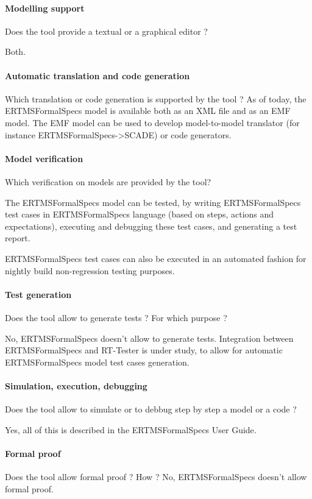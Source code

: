 \begin{author_comment}
\paragraph{Modelling support}
Does the tool provide a  textual or a graphical editor ?

Both.

\paragraph{Automatic translation and code generation}
Which translation or code generation is supported by the tool ?
As of today, the ERTMSFormalSpecs model is available both as an XML file and as an EMF model. The EMF model can be used to develop model-to-model translator (for instance ERTMSFormalSpecs->SCADE) or code generators.

\paragraph{Model verification}
Which verification on models are provided by the tool?

The ERTMSFormalSpecs model can be tested, by writing ERTMSFormalSpecs test cases in ERTMSFormalSpecs language (based on steps, actions and expectations), executing and debugging these test cases, and generating a test report. 

ERTMSFormalSpecs test cases can also be executed in an automated fashion for nightly build non-regression testing purposes.

\paragraph{Test generation}
Does the tool allow to generate tests ? For  which purpose ?

No, ERTMSFormalSpecs doesn't allow to generate tests. Integration between ERTMSFormalSpecs and RT-Tester is under study, to allow for automatic ERTMSFormalSpecs model test cases generation.

\paragraph{Simulation, execution, debugging}
Does the tool allow to simulate or to debbug step by step a model or a code ?

Yes, all of this is described in the ERTMSFormalSpecs User Guide.

\paragraph{Formal proof}
Does the tool allow formal proof ?  How ?
No, ERTMSFormalSpecs doesn't allow formal proof. 



\end{author_comment}
